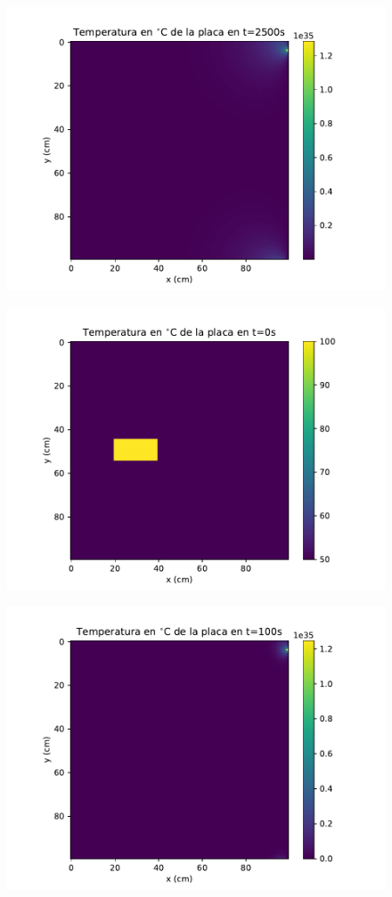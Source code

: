 \documentclass[12pt,letterpaper]{article}
\begin{document}
\begin{figure}[ht]
\includegraphics{a1_2500.pdf}
\centering
\end{figure}

\begin{figure}[ht]
\includegraphics{a2_0.pdf}
\centering
\end{figure}

\begin{figure}[ht]
\includegraphics{a2_100.pdf}
\centering
\end{figure}
\end{document}
